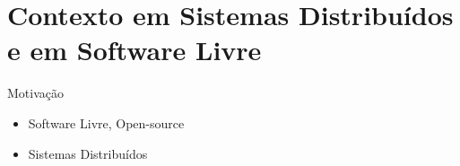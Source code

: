  \section{Contexto em Sistemas Distribuídos e em Software Livre}

  \begin{frame}{Motivação}
     \begin{itemize}
        \item Software Livre, Open-source
        \item Sistemas Distribuídos
     \end{itemize}
  \end{frame}
